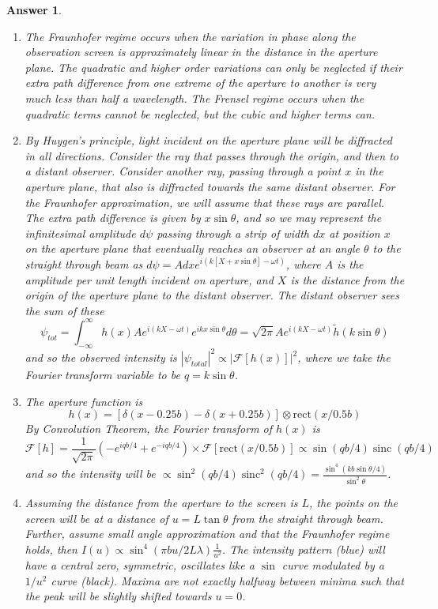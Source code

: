 \documentclass[a4paper]{article}
\DeclareMathOperator{\sinc}{sinc}
\newtheorem{ans}{Answer}[subsection]
\theoremstyle{new}
\begin{document}
\newpage
\begin{ans}\leavevmode
\begin{enumerate}[label=(\roman*)]
\item The Fraunhofer regime occurs when the variation in phase along the observation screen is approximately linear in the distance in the aperture plane. The quadratic and higher order variations can only be neglected if their extra path difference from one extreme of the aperture to another is very much less than half a wavelength. The Frensel regime occurs when the quadratic terms cannot be neglected, but the cubic and higher terms can.
\item By Huygen's principle, light incident on the aperture plane will be diffracted in all directions. Consider the ray that passes through the origin, and then to a distant observer. Consider another ray, passing through a point $x$ in the aperture plane, that also is diffracted towards the same distant observer. For the Fraunhofer approximation, we will assume that these rays are parallel. The extra path difference is given by $x\sin\theta$, and so we may represent the infinitesimal amplitude $d\psi$ passing through a strip of width $dx$ at position $x$ on the aperture plane that eventually reaches an observer at an angle $\theta$ to the straight through beam as $d\psi=Adx e^{i(k[X+x\sin\theta]-\omega t)}$, where $A$ is the amplitude per unit length incident on aperture, and $X$ is the distance from the origin of the aperture plane to the distant observer. The distant observer sees the sum of these
$$\psi_{tot}=\int_{-\infty}^\infty h(x)Ae^{i(kX-\omega t)}e^{ikx\sin\theta}d\theta=\sqrt{2\pi}Ae^{i(kX-\omega t)}\tilde{h}(k\sin\theta)$$
and so the observed intensity is $|\psi_{total}|^2\propto|\mathcal{F}[h(x)]|^2$, where we take the Fourier transform variable to be $q=k\sin\theta$.
\item The aperture function is
$$h(x)=[\delta(x-0.25b)-\delta(x+0.25b)]\otimes\text{rect}(x/0.5b)$$
By Convolution Theorem, the Fourier transform of $h(x)$ is
$$\mathcal{F}[h]=\frac{1}{\sqrt{2\pi}}(-e^{iqb/4}+e^{-iqb/4})\times\mathcal{F}[\text{rect}(x/0.5b)]\propto\sin(qb/4)\sinc(qb/4)$$
and so the intensity will be $\propto\sin^2(qb/4)\sinc^2(qb/4)=\frac{\sin^4(kb\sin\theta/4)}{\sin^2\theta}$.
\item Assuming the distance from the aperture to the screen is $L$, the points on the screen will be at a distance of $u=L\tan\theta$ from the straight through beam. Further, assume small angle approximation and that the Fraunhofer regime holds, then $I(u)\propto\sin^4(\pi bu/2L\lambda)\frac{1}{u^2}$. The intensity pattern (blue) will have a central zero, symmetric, oscillates like a $\sin$ curve modulated by a $1/u^2$ curve (black). Maxima are not exactly halfway between minima such that the peak will be slightly shifted towards $u=0$.

\end{enumerate}
\end{ans}
\end{document}
